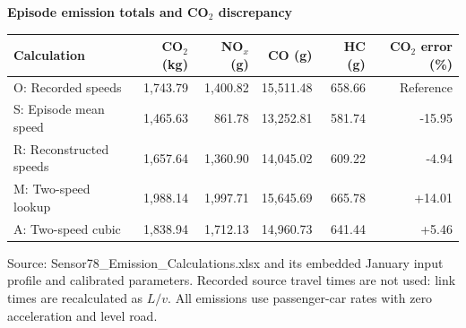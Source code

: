 
\vspace{8pt}\textbf{Episode emission totals and CO$_2$ discrepancy}\par
\renewcommand{\arraystretch}{1.4}\setlength{\tabcolsep}{4pt}
\begin{tabular*}{\linewidth}{@{\extracolsep{\fill}}lrrrrr@{}}\toprule
Calculation & CO$_2$ (kg) & NO$_x$ (g) & CO (g) & HC (g) & CO$_2$ error (\%)\\\midrule
O: Recorded speeds & 1,743.79 & 1,400.82 & 15,511.48 & 658.66 & Reference \\
S: Episode mean speed & 1,465.63 & 861.78 & 13,252.81 & 581.74 & -15.95 \\
R: Reconstructed speeds & 1,657.64 & 1,360.90 & 14,045.02 & 609.22 & -4.94 \\
M: Two-speed lookup & 1,988.14 & 1,997.71 & 15,645.69 & 665.78 & +14.01 \\
A: Two-speed cubic & 1,838.94 & 1,712.13 & 14,960.73 & 641.44 & +5.46 \\
\bottomrule\end{tabular*}
\par{}
\vfill
{\small\color{muted}Source: Sensor78\_Emission\_Calculations.xlsx and its embedded January input profile and calibrated parameters.
Recorded source travel times are not used: link times are recalculated as $L/v$. All emissions use passenger-car rates with zero acceleration and level road.}

